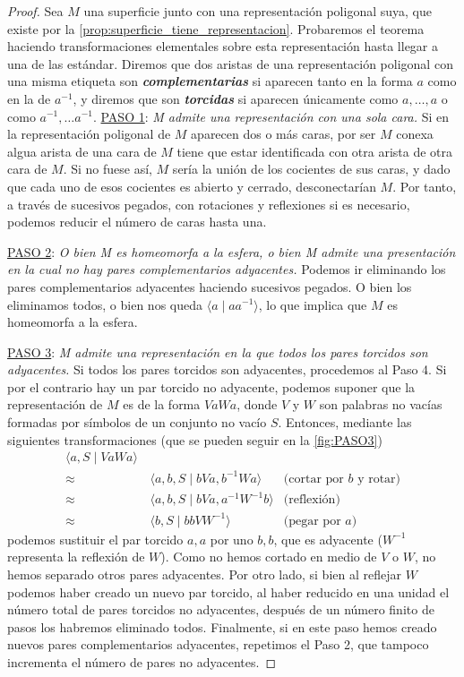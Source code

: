 \documentclass[10pt]{report}
\newcommand{\enfatiza}[1]{\textbf{\textit{#1}}}
\theoremstyle{definition}
\begin{document}
\begin{proof}
Sea $M$ una superficie junto con una representación poligonal suya, que existe por la \autoref{prop:superficie_tiene_representacion}. Probaremos el teorema haciendo transformaciones elementales sobre esta representación hasta llegar a una de las estándar.
Diremos que dos aristas de una representación poligonal con una misma etiqueta son \enfatiza{complementarias} si aparecen tanto en la forma $a$ como en la de $a^{-1}$, y diremos que son \enfatiza{torcidas} si aparecen únicamente como $a,\dots ,a$ o como $a^{-1},\dots a^{-1}$. 
\underline{PASO 1}: \textit{M admite una representación con una sola cara.} Si en la representación poligonal de $M$ aparecen dos o más caras, por ser $M$ conexa algua arista de una cara de $M$ tiene que estar identificada con otra arista de otra cara de $M$. Si no fuese así, $M$ sería la unión de los cocientes de sus caras, y dado que cada uno de esos cocientes es abierto y cerrado, desconectarían $M$. Por tanto, a través de sucesivos pegados, con rotaciones y reflexiones si es necesario, podemos reducir el número de caras hasta una.

\underline{PASO 2}: \textit{O bien M es homeomorfa a la esfera, o bien M admite una presentación en la cual no hay pares complementarios adyacentes.} Podemos ir eliminando los pares complementarios adyacentes haciendo sucesivos pegados. O bien los eliminamos todos, o bien nos queda $\langle a\mid aa^{-1}\rangle$, lo que implica que $M$ es homeomorfa a la esfera.

\underline{PASO 3}: \textit{M admite una representación en la que todos los pares torcidos son adyacentes.} Si todos los pares torcidos son adyacentes, procedemos al Paso 4. Si por el contrario hay un par torcido no adyacente, podemos suponer que la representación de $M$ es de la forma $VaWa$, donde $V$ y $W$ son palabras no vacías formadas por símbolos de un conjunto no vacío $S$. Entonces, mediante las siguientes transformaciones (que se pueden seguir en la \autoref{fig:PASO3})
\begin{align*}
\langle a,S \mid VaWa \rangle  &&\\
\approx &\, \langle a,b,S \mid bVa, b^{-1}Wa \rangle &\text{(cortar por } b\text{ y rotar)}\\
\approx &\, \langle a,b,S \mid bVa, a^{-1}W^{-1}b \rangle & \text{(reflexión)} \\
\approx &\, \langle b,S \mid bbVW^{-1}\rangle & \text{(pegar por } a\text{)}
\end{align*}
podemos sustituir el par torcido $a,a$ por uno $b,b$, que es adyacente ($W^{-1}$ representa la reflexión de $W$). Como no hemos cortado en medio de $V$ o $W$, no hemos separado otros pares adyacentes. Por otro lado, si bien al reflejar $W$ podemos haber creado un nuevo par torcido, al haber reducido en una unidad el número total de pares torcidos no adyacentes, después de un número finito de pasos los habremos eliminado todos. Finalmente, si en este paso hemos creado nuevos pares complementarios adyacentes, repetimos el Paso 2, que tampoco incrementa el número de pares no adyacentes.



\end{proof}
\end{document}
